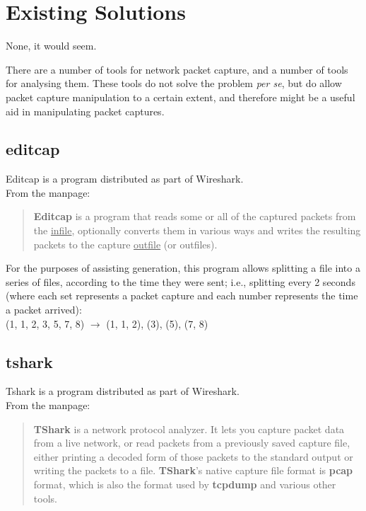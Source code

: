 \documentclass[10pt,a4paper,notitlepage]{report}
\begin{document}
\pagebreak

\section{Existing Solutions}
\label{sec:existing}
None, it would seem.

There are a number of tools for network packet capture, and a number of tools for analysing them. These tools do not solve the problem \emph{per se}, but do allow packet capture manipulation to a certain extent, and therefore might be a useful aid in manipulating packet captures.

\subsection{editcap}
Editcap is a program distributed as part of Wireshark.\\
From the manpage\cite{editcap-man}:
\begin{quote}
\textbf{Editcap} is a program that reads some or all of the captured packets from the \underline{infile}, optionally converts them in various ways and writes the resulting packets to the capture \underline{outfile} (or outfiles).
\end{quote}

For the purposes of assisting generation, this program allows splitting a file into a series of files, according to the time they were sent; i.e., splitting every 2 seconds (where each set represents a packet capture and each number represents the time a packet arrived):\\
\indent (1, 1, 2, 3, 5, 7, 8) $\rightarrow$ (1, 1, 2), (3), (5), (7, 8)

\subsection{tshark}
Tshark is a program distributed as part of Wireshark.\\
From the manpage\cite{tshark-man}:
\begin{quote}
\textbf{TShark} is a network protocol analyzer. It lets you capture packet data from a live network, or read packets from a previously saved capture file, either printing a decoded form of those packets to the standard output or writing the packets to a file.  \textbf{TShark}'s native capture file format is \textbf{pcap} format, which is also the format used by \textbf{tcpdump} and various other tools.
\end{quote}
\end{document}
